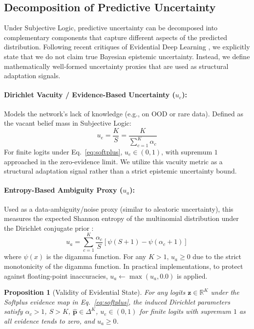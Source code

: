 \documentclass[letterpaper]{article} %
\newcommand{\R}{\mathbb{R}}
\newtheorem{proposition}{Proposition}
\begin{document}
\subsection{Decomposition of Predictive Uncertainty}\label{subsec:uncertainties}
Under Subjective Logic, predictive uncertainty can be decomposed into complementary components that capture different aspects of the predicted distribution. Following recent critiques of Evidential Deep Learning \cite{shen2024mirage}, we explicitly state that we do not claim true Bayesian epistemic uncertainty. Instead, we define mathematically well-formed uncertainty proxies that are used as structural adaptation signals.

\paragraph{Dirichlet Vacuity / Evidence-Based Uncertainty ($u_e$):} Models the network's lack of knowledge (e.g., on OOD or rare data). Defined as the vacant belief mass in Subjective Logic:
\begin{equation}\label{eq:u_e}
    u_e = \frac{K}{S} = \frac{K}{\sum_{c=1}^K \alpha_c}
\end{equation}
For finite logits under Eq.~\ref{eq:softplus}, $u_e \in (0, 1)$, with supremum $1$ approached in the zero-evidence limit. We utilize this vacuity metric as a structural adaptation signal rather than a strict epistemic uncertainty bound.

\paragraph{Entropy-Based Ambiguity Proxy ($u_a$):} Used as a data-ambiguity/noise proxy (similar to aleatoric uncertainty), this measures the expected Shannon entropy of the multinomial distribution under the Dirichlet conjugate prior \cite{malinin2018predictive}:
\begin{equation}\label{eq:u_a}
    u_a = \sum_{c=1}^K \frac{\alpha_c}{S} \left[\psi(S + 1) - \psi(\alpha_c + 1)\right]
\end{equation}
where $\psi(x)$ is the digamma function. For any $K > 1$, $u_a \ge 0$ due to the strict monotonicity of the digamma function. In practical implementations, to protect against floating-point inaccuracies, $u_a \leftarrow \max(u_a, 0.0)$ is applied.

\begin{proposition}[Validity of Evidential State]
\label{prop:evidential_validity}
For any logits $\bm{z}\in\R^K$ under the Softplus evidence map in Eq.~\ref{eq:softplus}, the induced Dirichlet parameters satisfy $\alpha_c>1$, $S>K$, $\hat{\bm{p}}\in\Delta^K$, $u_e\in(0,1)$ for finite logits with supremum $1$ as all evidence tends to zero, and $u_a\ge0$.
\end{proposition}
\end{document}
